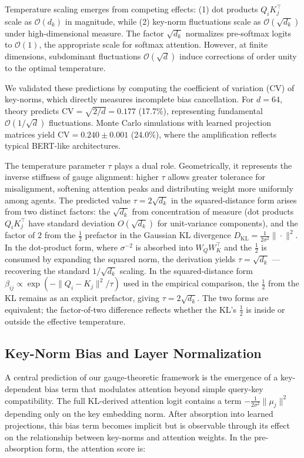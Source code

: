 \documentclass[twoside,11pt]{article}
\begin{document}
Temperature scaling emerges from competing effects: (1) dot products $Q_i K_j^\top$ scale as $\mathcal{O}(d_k)$ in magnitude, while (2) key-norm fluctuations scale as $\mathcal{O}(\sqrt{d_k})$ under high-dimensional measure. The factor $\sqrt{d_k}$ normalizes pre-softmax logits to $\mathcal{O}(1)$, the appropriate scale for softmax attention. However, at finite dimensions, subdominant fluctuations $\mathcal{O}(\sqrt{d})$ induce corrections of order unity to the optimal temperature.

We validated these predictions by computing the coefficient of variation (CV) of key-norms, which directly measures incomplete bias cancellation. For $d = 64$, theory predicts $\text{CV} = \sqrt{2/d} = 0.177$ (17.7\%), representing fundamental $\mathcal{O}(1/\sqrt{d})$ fluctuations. Monte Carlo simulations with learned projection matrices yield $\text{CV} = 0.240 \pm 0.001$ (24.0\%), where the amplification reflects typical BERT-like architectures.

The temperature parameter $\tau$ plays a dual role. Geometrically, it represents the inverse stiffness of gauge alignment: higher $\tau$ allows greater tolerance for misalignment, softening attention peaks and distributing weight more uniformly among agents. The predicted value $\tau = 2\sqrt{d_k}$ in the squared-distance form arises from two distinct factors: the $\sqrt{d_k}$ from concentration of measure (dot products $Q_i K_j^\top$ have standard deviation $O(\sqrt{d_k})$ for unit-variance components), and the factor of $2$ from the $\frac{1}{2}$ prefactor in the Gaussian KL divergence $D_{\mathrm{KL}} = \frac{1}{2\sigma^2}\|\cdot\|^2$. In the dot-product form, where $\sigma^{-2}$ is absorbed into $W_Q W_K^\top$ and the $\frac{1}{2}$ is consumed by expanding the squared norm, the derivation yields $\tau = \sqrt{d_k}$ --- recovering the standard $1/\sqrt{d_k}$ scaling. In the squared-distance form $\beta_{ij} \propto \exp(-\|Q_i - K_j\|^2/\tau)$ used in the empirical comparison, the $\frac{1}{2}$ from the KL remains as an explicit prefactor, giving $\tau = 2\sqrt{d_k}$. The two forms are equivalent; the factor-of-two difference reflects whether the KL's $\frac{1}{2}$ is inside or outside the effective temperature.

\subsection{Key-Norm Bias and Layer Normalization}

A central prediction of our gauge-theoretic framework is the emergence of a key-dependent bias term that modulates attention beyond simple query-key compatibility. The full KL-derived attention logit contains a term $-\frac{1}{2\sigma^2}\|\mu_j\|^2$ depending only on the key embedding norm. After absorption into learned projections, this bias term becomes implicit but is observable through its effect on the relationship between key-norms and attention weights. In the pre-absorption form, the attention score is:
\end{document}
